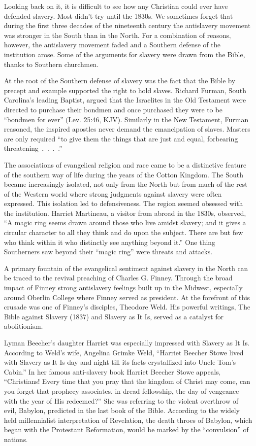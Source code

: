 Looking back on it, it is difficult to see how any Christian could ever have defended slavery. Most
didn’t try until the 1830s. We sometimes forget that during the first three decades of the
nineteenth century the antislavery movement was stronger in the South than in the North. For a
combination of reasons, however, the antislavery movement faded and a Southern defense of the
institution arose. Some of the arguments for slavery were drawn from the Bible, thanks to Southern
churchmen.

At the root of the Southern defense of slavery was the fact that the Bible by precept and example
supported the right to hold slaves. Richard Furman, South Carolina’s leading Baptist, argued that
the Israelites in the Old Testament were directed to purchase their bondmen and once purchased they
were to be “bondmen for ever” (Lev. 25:46, KJV). Similarly in the New Testament, Furman reasoned,
the inspired apostles never demand the emancipation of slaves. Masters are only required “to give
them the things that are just and equal, forbearing threatening~.~.~.~.”

The associations of evangelical religion and race came to be a distinctive feature of the southern
way of life during the years of the Cotton Kingdom. The South became increasingly isolated, not only
from the North but from much of the rest of the Western world where strong judgments against slavery
were often expressed. This isolation led to defensiveness. The region seemed obsessed with the
institution. Harriet Martineau, a visitor from abroad in the 1830s, observed, “A magic ring seems
drawn around those who live amidst slavery; and it gives a circular character to all they think and
do upon the subject. There are but few who think within it who distinctly see anything beyond it.”
One thing Southerners saw beyond their “magic ring” were threats and attacks.

A primary fountain of the evangelical sentiment against slavery in the North can be traced to the
revival preaching of Charles G. Finney. Through the broad impact of Finney strong antislavery
feelings built up in the Midwest, especially around Oberlin College where Finney served as
president. At the forefront of this crusade was one of Finney’s disciples, Theodore Weld. His
powerful writings, The Bible against Slavery (1837) and Slavery as It Is, served as a catalyst for
abolitionism.

Lyman Beecher’s daughter Harriet was especially impressed with Slavery as It Is. According to Weld’s
wife, Angelina Grimke Weld, “Harriet Beecher Stowe lived with Slavery as It Is day and night till
its facts crystallized into Uncle Tom’s Cabin.” In her famous anti-slavery book Harriet Beecher
Stowe appeals, “Christians! Every time that you pray that the kingdom of Christ may come, can you
forget that prophecy associates, in dread fellowship, the day of vengeance with the year of His
redeemed?” She was referring to the violent overthrow of evil, Babylon, predicted in the last book
of the Bible. According to the widely held millennialist interpretation of Revelation, the death
throes of Babylon, which began with the Protestant Reformation, would be marked by the “convulsion”
of nations.

